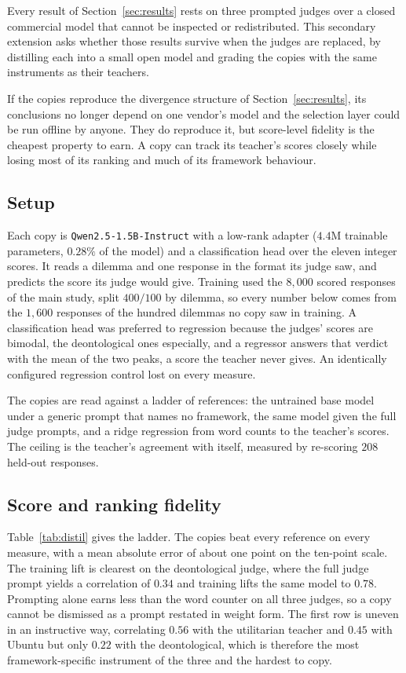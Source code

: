 \documentclass[10pt,twocolumn,a4paper]{article}
\let\cite\citep
\begin{document}
Every result of Section~\ref{sec:results} rests on three prompted judges
over a closed commercial model that cannot be inspected or
redistributed. This secondary extension asks whether those results
survive when the judges are replaced, by distilling each into a small
open model and grading the copies with the same instruments as their
teachers.

If the copies reproduce the divergence structure of
Section~\ref{sec:results}, its conclusions no longer depend on one
vendor's model and the selection layer could be run offline by anyone.
They do reproduce it, but score-level fidelity is the cheapest property
to earn. A copy can track its teacher's scores closely while losing
most of its ranking and much of its framework behaviour.

\subsection{Setup}

Each copy is \texttt{Qwen2.5-1.5B-Instruct} \cite{yang2024} with a
low-rank adapter \cite{hu2022}
($4.4$M trainable parameters, $0.28\%$ of the model) and a
classification head over the eleven integer scores. It reads a dilemma
and one response in the format its judge saw, and predicts the score
its judge would give. Training used the $8{,}000$ scored responses of
the main study, split $400/100$ by dilemma, so every number below comes
from the $1{,}600$ responses of the hundred dilemmas no copy saw in
training. A classification head was preferred to regression because the
judges' scores are bimodal, the deontological ones especially, and a
regressor answers that verdict with the mean of the two peaks, a score
the teacher never gives. An identically configured regression control
lost on every measure.

The copies are read against a ladder of references: the untrained base
model under a generic prompt that names no framework, the same model
given the full judge prompts, and a ridge regression from word counts
to the teacher's scores. The ceiling is the teacher's agreement with
itself, measured by re-scoring $208$ held-out responses.

\subsection{Score and ranking fidelity}

Table~\ref{tab:distil} gives the ladder. The copies beat every reference
on every measure, with a mean absolute error of about one point on the
ten-point scale. The training lift is clearest on the deontological
judge, where the full judge prompt yields a correlation of $0.34$ and
training lifts the same model to $0.78$. Prompting alone earns less than
the word counter on all three judges, so a copy cannot be dismissed as a
prompt restated in weight form. The first row is uneven in an
instructive way, correlating \(0.56\) with the utilitarian teacher and
\(0.45\) with Ubuntu but only \(0.22\) with the deontological, which is
therefore the most framework-specific instrument of the three and the
hardest to copy.
\end{document}
